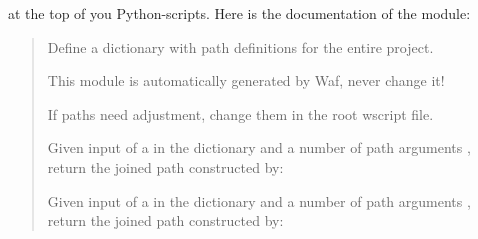 \documentclass[a4paper,11pt,english]{sphinxmanual}
\begin{document}
%
\begin{sphinxVerbatim}[commandchars=\\\{\}]
   
\end{sphinxVerbatim}

at the top of you Python-scripts. Here is the documentation of the module:
\begin{quote}


\label{\detokenize{introduction:module-bld.project_paths}}
Define a dictionary  with path
definitions for the entire project.

This module is automatically generated by Waf, never change it!

If paths need adjustment, change them in the root wscript file.

\begin{fulllineitems}
\label{\detokenize{introduction:bld.project_paths.project_paths_join}}
Given input of a  in the  dictionary and a number
of path arguments , return the joined path constructed by:

%
\begin{sphinxVerbatim}[commandchars=\\\{\}]
\PYG{p}{[}\PYG{p}{]} 
\end{sphinxVerbatim}

\end{fulllineitems}


\begin{fulllineitems}
\label{\detokenize{introduction:bld.project_paths.project_paths_join_latex}}
Given input of a  in the  dictionary and a number
of path arguments , return the joined path constructed by:


\end{fulllineitems}
\end{quote}
\end{document}
